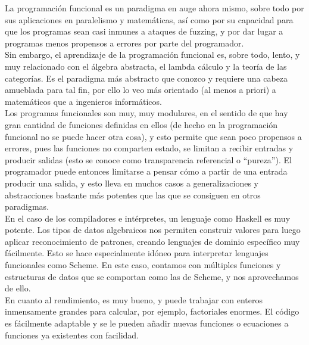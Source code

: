 

La programaci\'on funcional es un paradigma en auge ahora mismo, sobre todo por sus aplicaciones en paralelismo y matem\'aticas, as\'i como por su capacidad para que los programas sean casi inmunes a ataques de fuzzing, y por dar lugar a programas menos propensos a errores por parte del programador.\\

Sin embargo, el aprendizaje de la programaci\'on funcional es, sobre todo, lento, y muy relacionado con el \'algebra abstracta, el lambda c\'alculo y la teor\'ia de las categor\'ias. Es el paradigma m\'as abstracto que conozco y requiere una cabeza amueblada para tal fin, por ello lo veo m\'as orientado (al menos a priori) a matem\'aticos que a ingenieros inform\'aticos.\\

Los programas funcionales son muy, muy modulares, en el sentido de que hay gran cantidad de funciones definidas en ellos (de hecho en la programaci\'on funcional no se puede hacer otra cosa), y esto permite que sean poco propensos a errores, pues las funciones no comparten estado, se limitan a recibir entradas y producir salidas (esto se conoce como transparencia referencial o ``pureza''). El programador puede entonces limitarse a pensar c\'omo a partir de una entrada producir una salida, y esto lleva en muchos casos a generalizaciones y abstracciones bastante m\'as potentes que las que se consiguen en otros paradigmas.\\

En el caso de los compiladores e int\'erpretes, un lenguaje como Haskell es muy potente. Los tipos de datos algebraicos nos permiten construir valores para luego aplicar reconocimiento de patrones, creando lenguajes de dominio espec\'ifico muy f\'acilmente. Esto se hace especialmente id\'oneo para interpretar lenguajes funcionales como Scheme. En este caso, contamos con m\'ultiples funciones y estructuras de datos que se comportan como las de Scheme, y nos aprovechamos de ello.\\

En cuanto al rendimiento, es muy bueno, y puede trabajar con enteros inmensamente grandes para calcular, por ejemplo, factoriales enormes. El c\'odigo es f\'acilmente adaptable y se le pueden a\~{n}adir nuevas funciones o ecuaciones a funciones ya existentes con facilidad.\\

